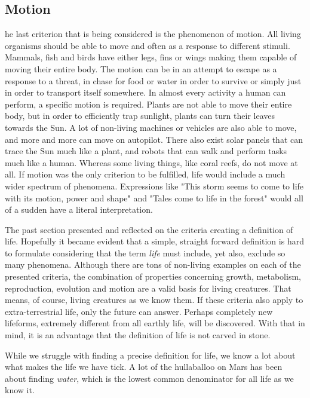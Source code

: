 \subsection{Motion}
he last criterion that is being considered is the phenomenon of motion.
All living organisms should be able to move and often as a response to different stimuli.
Mammals, fish and birds have either legs, fins or wings making them capable of moving their entire body.
The motion can be in an attempt to escape as a response to a threat, in chase for food or water in order to survive or simply just in order to transport itself somewhere.
In almost every activity a human can perform, a specific motion is required.
Plants are not able to move their entire body, but in order to efficiently trap sunlight, plants can turn their leaves towards the Sun.
A lot of non-living machines or vehicles are also able to move, and more and more can move on autopilot.
There also exist solar panels that can trace the Sun much like a plant, and robots that can walk and perform tasks much like a human.
Whereas some living things, like coral reefs, do not move at all.
If motion was the only criterion to be fulfilled, life would include a much wider spectrum of phenomena.
Expressions like "This storm seems to come to life with its motion, power and shape" and "Tales come to life in the forest" would all of a sudden have a literal interpretation. 


The past section presented and reflected on the criteria creating a definition of life.
Hopefully it became evident that a simple, straight forward definition is hard to formulate considering that the term \textit{life} must include, yet also, exclude so many phenomena.
Although there are tons of non-living examples on each of the presented criteria, the combination of properties concerning growth, metabolism, reproduction, evolution and motion are a valid basis for living creatures.
That means, of course, living creatures as we know them.
If these criteria also apply to extra-terrestrial life, only the future can answer.
Perhaps completely new lifeforms, extremely different from all earthly life, will be discovered.
With that in mind, it is an advantage that the definition of life is not carved in stone. 


While we struggle with finding a precise definition for life, we know a lot about what makes the life we have tick. A lot of the hullaballoo on Mars has been about finding \emph{water}, which is the lowest common denominator for all life as we know it. 